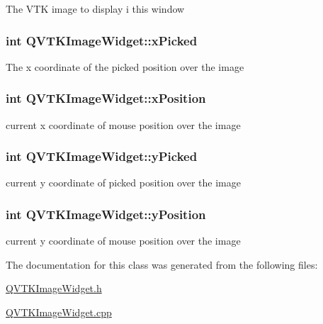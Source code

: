 The V\-T\-K image to display i this window \hypertarget{class_q_v_t_k_image_widget_a17897def9ef084b36378099c51f94be3}{
\subsubsection[{x\-Picked}]{\setlength{\rightskip}{0pt plus 5cm}int {\bf Q\-V\-T\-K\-Image\-Widget\-::x\-Picked}}}\label{d8/dd7/class_q_v_t_k_image_widget_a17897def9ef084b36378099c51f94be3}
The x coordinate of the picked position over the image \hypertarget{class_q_v_t_k_image_widget_afd88ea5dbed175232b0c15cbe4cdca89}{
\subsubsection[{x\-Position}]{\setlength{\rightskip}{0pt plus 5cm}int {\bf Q\-V\-T\-K\-Image\-Widget\-::x\-Position}}}\label{d8/dd7/class_q_v_t_k_image_widget_afd88ea5dbed175232b0c15cbe4cdca89}
current x coordinate of mouse position over the image \hypertarget{class_q_v_t_k_image_widget_a484346a1e5c956917e7e35a22aee125a}{
\subsubsection[{y\-Picked}]{\setlength{\rightskip}{0pt plus 5cm}int {\bf Q\-V\-T\-K\-Image\-Widget\-::y\-Picked}}}\label{d8/dd7/class_q_v_t_k_image_widget_a484346a1e5c956917e7e35a22aee125a}
current y coordinate of picked position over the image \hypertarget{class_q_v_t_k_image_widget_a6724caff3a614db8321deaa70532255c}{
\subsubsection[{y\-Position}]{\setlength{\rightskip}{0pt plus 5cm}int {\bf Q\-V\-T\-K\-Image\-Widget\-::y\-Position}}}\label{d8/dd7/class_q_v_t_k_image_widget_a6724caff3a614db8321deaa70532255c}
current y coordinate of mouse position over the image 

The documentation for this class was generated from the following files\-:\begin{DoxyCompactItemize}
\item 
\hyperlink{_q_v_t_k_image_widget_8h}{Q\-V\-T\-K\-Image\-Widget.\-h}\item 
\hyperlink{_q_v_t_k_image_widget_8cpp}{Q\-V\-T\-K\-Image\-Widget.\-cpp}\end{DoxyCompactItemize}
